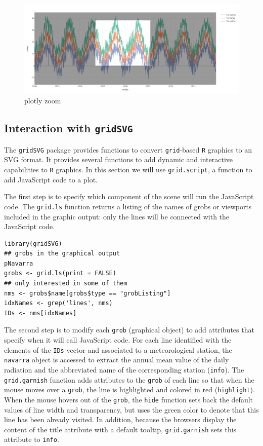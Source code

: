 \documentclass[smallroyalvopaper]{memoir}
\begin{document}
\begin{figure}[htbp]
\centering
\includegraphics[width=.9\linewidth]{figs/plotly_aranjuez_zoom.png}
\caption{plotly zoom \label{fig:plotly_zoom}}
\end{figure}


\subsection{\floweroneleft Interaction with \texttt{gridSVG}}
\label{sec:orgddd9fba}
The \texttt{gridSVG} package provides functions to convert \texttt{grid}-based \texttt{R}
graphics to an SVG format. It provides several functions to add
dynamic and interactive capabilities to \texttt{R} graphics. In this section
we will use \texttt{grid.script}, a function to add JavaScript code to a
plot.

The first step is to specify which component of the scene
will run the JavaScript code. The \texttt{grid.ls} function  returns a
listing of the names of grobs or viewports included in the graphic
output: only the lines will be connected with the JavaScript
code. 


\lstset{language=r,label= ,caption= ,captionpos=b,numbers=none}
\begin{lstlisting}
library(gridSVG)
## grobs in the graphical output
pNavarra
grobs <- grid.ls(print = FALSE)
## only interested in some of them
nms <- grobs$name[grobs$type == "grobListing"]
idxNames <- grep('lines', nms)
IDs <- nms[idxNames]
\end{lstlisting}

The second step is to modify each \texttt{grob} (graphical object) to add
attributes that specify when it will call JavaScript code. For each
line identified with the elements of the \texttt{IDs} vector and associated
to a meteorological station, the \texttt{navarra} object is accessed to
extract the annual mean value of the daily radiation and the
abbreviated name of the corresponding station (\texttt{info}).  The
\texttt{grid.garnish} function adds attributes to the \texttt{grob} of each line so
that when the mouse moves over a \texttt{grob}, the line is highlighted and
colored in red (\texttt{highlight}). When the mouse hovers out of the \texttt{grob},
the \texttt{hide} function sets back the default values of line width and
transparency, but uses the green color to denote that this line has
been already visited. In addition, because the browsers display the
content of the title attribute with a default tooltip, \texttt{grid.garnish}
sets this attribute to \texttt{info}.
\end{document}
